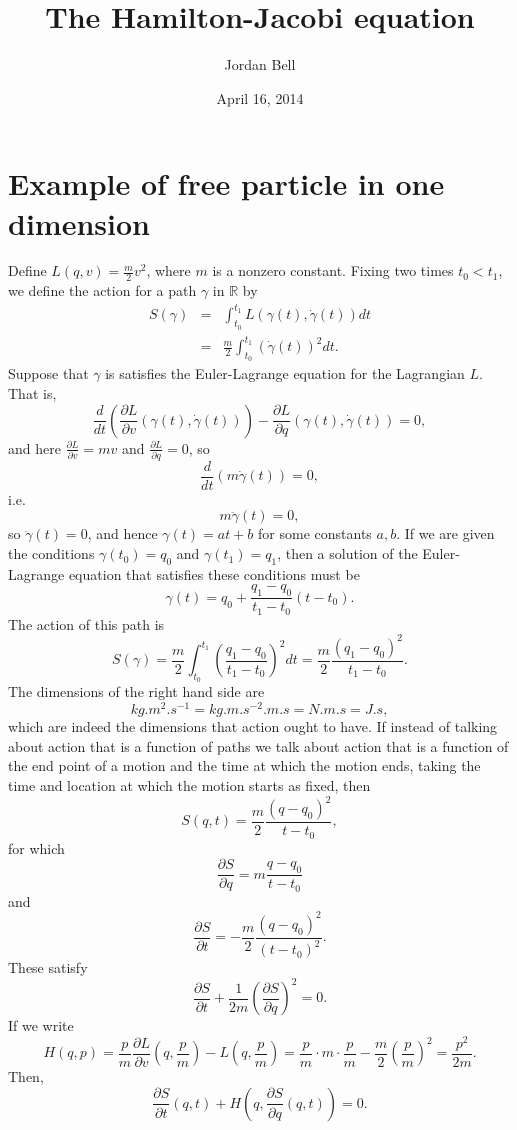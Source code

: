 \documentclass{article}
\theoremstyle{definition}
\begin{document}
\title{The Hamilton-Jacobi equation}
\author{Jordan Bell}
\date{April 16, 2014}

\maketitle

\section{Example of free particle in one dimension}
Define $L(q,v)=\frac{m}{2}v^2$, where $m$ is a nonzero constant. Fixing two times $t_0<t_1$, we define the action for a path $\gamma$ in $\mathbb{R}$ by
\begin{eqnarray*}
S(\gamma) &=& \int_{t_0}^{t_1} L(\gamma(t),\dot{\gamma}(t)) dt\\
&=&\frac{m}{2} \int_{t_0}^{t_1} (\dot{\gamma}(t))^2 dt. 
\end{eqnarray*}
Suppose that $\gamma$ is satisfies the Euler-Lagrange equation for the Lagrangian $L$. That is,
\[
\frac{d}{dt} \left(\frac{\partial L}{\partial v}(\gamma(t),\dot{\gamma}(t)) \right)  - \frac{\partial L}{\partial q}(\gamma(t),\dot{\gamma}(t)) = 0,
\]
and here $\frac{\partial L}{\partial v}=mv$ and $\frac{\partial L}{\partial q}=0$, so
\[
\frac{d}{dt} (m \dot{\gamma}(t))=0,
\]
i.e.
\[
m\ddot{\gamma}(t)=0,
\]
so $\ddot{\gamma}(t)=0$, and hence $\gamma(t)=at+b$ for some constants $a,b$. If we are given the conditions $\gamma(t_0)=q_0$
and $\gamma(t_1)=q_1$, then a solution of the Euler-Lagrange equation that satisfies these conditions must be
\[
\gamma(t) = q_0 + \frac{q_1-q_0}{t_1-t_0} ( t-t_0).
\]
The action of this path is
\[
S(\gamma)=\frac{m}{2} \int_{t_0}^{t_1} \left(\frac{q_1-q_0}{t_1-t_0} \right)^2 dt=
\frac{m}{2} \frac{(q_1-q_0)^2}{t_1-t_0}.
\]
The dimensions of the right hand side are 
\[
\si{kg. m^2 . s^{-1}}=\si{kg . m . s^{-2} . m. s}=\si{N . m . s} = \si{J.s},
\]
 which are indeed the dimensions
that action ought to have.
If instead of talking about action that is a function of paths we talk about action that is a function of the end point of a motion and the time
at which the motion ends, taking the time and location at which the motion starts as fixed, then
\[
S(q,t) = \frac{m}{2} \frac{(q-q_0)^2}{t-t_0},
\]
for which
\[
\frac{\partial S}{\partial q} = m \frac{q-q_0}{t-t_0}
\]
and
\[
\frac{\partial S}{\partial t} = - \frac{m}{2} \frac{(q-q_0)^2}{(t-t_0)^2}.
\]
These satisfy
\[
\frac{\partial S}{\partial t}  + \frac{1}{2m} \left(\frac{\partial S}{\partial q}\right)^2=0.
\]
If we write
\[
H(q,p) = \frac{p}{m} \frac{\partial L}{\partial v}\left(q,\frac{p}{m} \right)  - L\left(q,\frac{p}{m}\right) = \frac{p}{m} \cdot m \cdot \frac{p}{m} - \frac{m}{2} \left( \frac{p}{m}\right)^2 = 
\frac{p^2}{2m}.
\]
Then,
\[
\frac{\partial S}{\partial t}(q,t) + H\left(q,\frac{\partial S}{\partial q}(q,t) \right)=0.
\]
\end{document}
